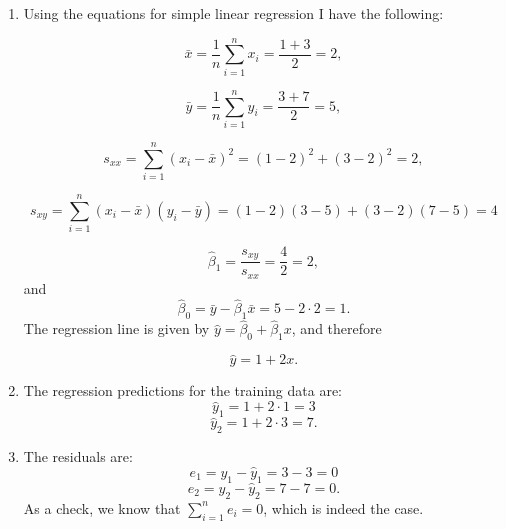 \begin{problem}{22}$ $
\begin{enumerate}

\item Using the equations for simple linear regression I have the following:

\begin{equation*}
\bar x = \frac{1}{n}\sum_{i=1}^n x_i= \frac{1+3}{2} = 2,
\end{equation*}

\begin{equation*}
\bar y= \frac{1}{n}\sum_{i=1}^n y_i= \frac{3+7}{2} = 5,
\end{equation*}

\begin{equation*}
s_{xx} = \sum_{i=1}^n(x_i-\bar x)^2 = (1-2)^2+(3-2)^2= 2,
\end{equation*}

\begin{equation*}
s_{xy} = \sum_{i=1}^n(x_i-\bar x)(y_i-\bar y) = (1-2)(3-5)+(3-2)(7-5) = 4
\end{equation*}

\begin{equation*}
\hat \beta_1 = \frac{s_{xy}}{s_{xx}} = \frac{4}{2}=2,
\end{equation*}
and
\begin{equation*}
\hat \beta_0 = \bar y - \hat \beta_1 \bar x = 5-2\cdot2 = 1.
\end{equation*}
The regression line is given by $\hat y = \hat \beta_0+\hat \beta_1 x$, and therefore

\begin{equation*}
\hat y =1+2x.
\end{equation*}

\item The regression predictions for the training data are:
\begin{equation*}
\hat y_1 = 1+2\cdot 1=3
\end{equation*}
\begin{equation*}
\hat y_2 = 1+2\cdot 3=7.
\end{equation*}

\item The residuals are:
\begin{equation*}
e_1 = y_1 - \hat y_1=3-3=0
\end{equation*}
\begin{equation*}
e_2 = y_2 - \hat y_2=7-7=0.
\end{equation*}
As a check, we know that $\sum_{i=1}^n e_i =0$, which is indeed the case.


\end{enumerate}
\end{problem}
